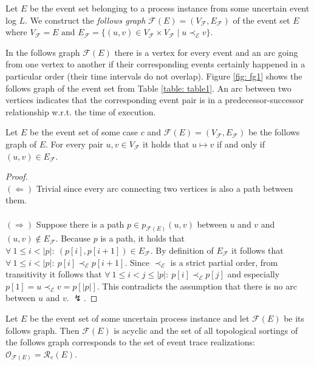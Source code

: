 \begin{definition}\label{def: follows graph}
Let $E$ be the event set belonging to a process instance from some uncertain event log $L$.
We construct the \emph{follows graph} $\mathcal{F}(E)=(V_{\mathcal{F}},E_{\mathcal{F}})$ of the event set $E$ where 
$V_{\mathcal{F}} = E \text{ and }
E_{\mathcal{F}} = \{(u,v) \in V_{\mathcal{F}} \times V_{\mathcal{F}} \mid 
u \prec_{\mathcal{E}} v \}.$
\end{definition}

In the follows graph $\mathcal{F}(E)$ there is a vertex for every event and an arc going from one vertex to another if their corresponding events certainly happened in a particular order (their time intervals do not overlap).
Figure \ref{fig: fg1} shows the follows graph of the event set from Table \ref{table: table1}.
An arc between two vertices indicates that the corresponding event pair is in a predecessor-successor relationship w.r.t. the time of execution.

\begin{lemma}\label{lemma: edge path}
Let $E$ be the event set of some case $c$ and $\mathcal{F}(E)=(V_{\mathcal{F}},E_{\mathcal{F}})$ be the follows graph of $E$.
For every pair $u,v \in V_{\mathcal{F}}$ it holds that $u \mapsto v$ if and only if $(u,v) \in E_{\mathcal{F}}$.
\end{lemma}

\begin{proof} 
\leavevmode \\ 
$(\Leftarrow)$ Trivial since every arc connecting two vertices is also a path between them. \\ \\
$(\Rightarrow)$ Suppose there is a path $p \in p_{\mathcal{F}(E)}(u,v)$ between $u$ and $v$ and $(u,v) \not \in E_{\mathcal{F}}$.
Because $p$ is a path, it holds that 
$\forall ~ 1 \leq i < |p|: ~ (p[i],p[i+1]) \in E_{\mathcal{F}}$.
By definition of $E_{\mathcal{F}}$ it follows that 
$\forall ~ 1 \leq i < |p|: ~ p[i] \prec_{\mathcal{E}} p[i+1]$.
Since $\prec_{\mathcal{E}}$ is a strict partial order, from transitivity it follows that $\forall ~ 1 \leq i < j \leq |p|: ~ p[i] \prec_{\mathcal{E}} p[j]$ and especially $p[1]=u \prec_{\mathcal{E}} v=p[|p|]$.
This contradicts the assumption that there is no arc between $u$ and $v$.
$\lightning$.
\end{proof}

\begin{theorem}\label{theorem: topological sortings}
Let $E$ be the event set of some uncertain process instance and let $\mathcal{F}(E)$ be its follows graph.
Then $\mathcal{F}(E)$ is acyclic and the set of all topological sortings of the follows graph corresponds to the set of event trace realizations: $\mathcal{O}_{\mathcal{F}(E)} = \mathcal{R}_e(E)$.
\end{theorem}

